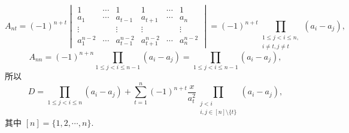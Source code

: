 \documentclass[../../main.tex]{subfiles}%
\begin{document}
\begin{solution}
\[\]
\[
A_{nt} = (-1)^{n + t} \begin{vmatrix} 1 & \cdots & 1 & 1 & \cdots & 1 \\ a_1 & \cdots & a_{t - 1} & a_{t + 1} & \cdots & a_n \\ \vdots & & \vdots & \vdots & & \vdots \\ a_1^{n - 2} & \cdots & a_{t - 1}^{n - 2} & a_{t + 1}^{n - 2} & \cdots & a_n^{n - 2} \end{vmatrix} = (-1)^{n + t} \prod_{\substack{1 \leqslant j < i \leqslant n, \\ i \neq t, j \neq t}} (a_i - a_j),
\]
\[
A_{nn}=(-1)^{n+n}\prod_{1\leqslant j<i\leqslant n-1}{\left( a_i-a_j \right)}=\prod_{1\leqslant j<i\leqslant n-1}{\left( a_i-a_j \right)},
\]
所以
\[
D = \prod_{1 \leqslant j < i \leqslant n} (a_i - a_j) + \sum_{t = 1}^n (-1)^{n + t} \dfrac{x}{a_t^2} \prod_{\substack{j < i \\ i, j \in [n] \setminus \{t\}}} (a_i - a_j),
\]
其中 \([n] = \{1, 2, \cdots, n\}\).

\end{solution}
\end{document}
